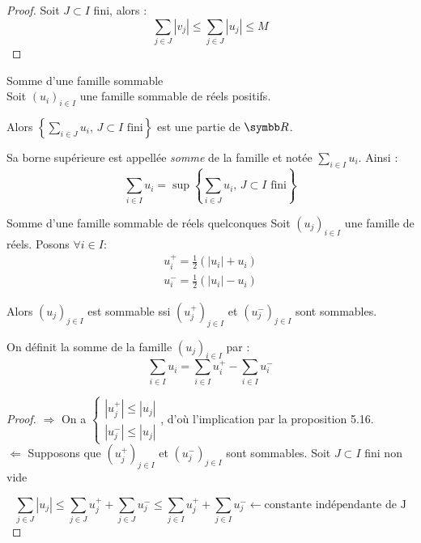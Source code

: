 \begin{proof}
    Soit $J \subset I$ fini, alors :
    \[\sum_{j \in J} |v_j| \leqslant \sum_{j \in J} |u_j| \leqslant M\]
\end{proof}


\begin{definition}{Somme d'une famille sommable}{}\\
    Soit $(u_i)_{i \in I}$ une famille sommable de réels positifs. 

    Alors $\displaystyle \left\{ \sum_{i \in J} u_i, \, J \subset I \text{ fini}  \right\}$ est une partie 
    de $\R$. 

    Sa borne supérieure est appellée \emph{somme} de la famille et notée $\displaystyle \sum_{i \in I} u_i$.
    Ainsi : \[\sum_{i \in I} u_i = \sup \left\{ \sum_{i \in J} u_i, \, J \subset I \text{ fini}  \right\}\]
\end{definition}

\begin{theoreme}{Somme d'une famille sommable de réels quelconques}{}
    Soit $(u_j)_{i \in I}$ une famille de réels. 
    Posons $\forall i \in I : $ 
    \begin{align*}
        u_i^+ = \frac 1 2 (|u_i| + u_i)\\
        u_i^- = \frac 1 2 (|u_i| - u_i)
    \end{align*}

    Alors $(u_j)_{j\in I}$ est sommable ssi $(u_j^+)_{j\in I}$ et $(u_j^-)_{j\in I}$ sont sommables.

    On définit la somme de la famille $(u_j)_{i \in I}$ par :
    \[\sum_{i \in I} u_i = \sum_{i \in I} u_i^+ - \sum_{i \in I} u_i^-\]
\end{theoreme}


\begin{proof}
    $\Rightarrow$ On a $\begin{cases}
        |u_j^+| \leqslant |u_j|\\
        |u_j^-| \leqslant |u_j|
    \end{cases}$, d'où l'implication par la proposition 5.16.\\

    $\Leftarrow$ Supposons que $(u_j^+)_{j\in I}$ et $(u_j^-)_{j\in I}$ sont sommables. Soit $J\subset I$ fini non vide

    \[\sum_{j\in J} |u_j|\leqslant\sum_{j\in J} u_j^+ + \sum_{j\in J} u_j^-\leqslant \sum_{j\in I} u_j^+ + \sum_{j\in I} u_j^- \leftarrow\text{constante indépendante de J}\]
\end{proof}


